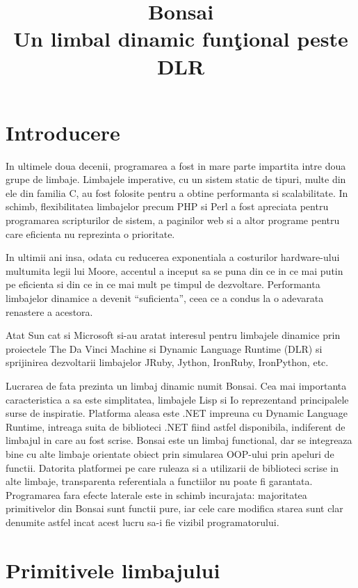 \documentclass[12pt,a4paper]{report}
\title{Bonsai\\Un limbal dinamic fun\c tional peste DLR}
\begin{document}
\maketitle
\tableofcontents

\chapter{Introducere}

In ultimele doua decenii, programarea a fost in mare parte impartita intre doua grupe de limbaje. Limbajele imperative, cu un sistem static de tipuri, multe din ele din familia C, au fost folosite pentru a obtine performanta si scalabilitate. In schimb, flexibilitatea limbajelor precum PHP si Perl a fost apreciata pentru programarea scripturilor de sistem, a paginilor web si a altor programe pentru care eficienta nu reprezinta o prioritate.

In ultimii ani insa, odata cu reducerea exponentiala a costurilor hardware-ului multumita legii lui Moore, accentul a inceput sa se puna din ce in ce mai putin pe eficienta si din ce in ce mai mult pe timpul de dezvoltare. Performanta limbajelor dinamice a devenit ``suficienta'', ceea ce a condus la o adevarata renastere a acestora.

Atat Sun cat si Microsoft si-au aratat interesul pentru limbajele dinamice prin proiectele The Da Vinci Machine\cite{daVinciMachine} si Dynamic Language Runtime (DLR)\cite{dlr} si sprijinirea dezvoltarii limbajelor JRuby\cite{jruby}, Jython\cite{jython}, IronRuby\cite{ironruby}, IronPython\cite{ironpython}, etc.

Lucrarea de fata prezinta un limbaj dinamic numit Bonsai. Cea mai importanta caracteristica a sa este simplitatea, limbajele Lisp si Io \cite{io} reprezentand principalele surse de inspiratie. Platforma aleasa este .NET impreuna cu Dynamic Language Runtime, intreaga suita de biblioteci .NET fiind astfel disponibila, indiferent de limbajul in care au fost scrise. Bonsai este un limbaj functional, dar se integreaza bine cu alte limbaje orientate obiect prin simularea OOP-ului prin apeluri de functii. Datorita platformei pe care ruleaza si a utilizarii de biblioteci scrise in alte limbaje, transparenta referentiala a functiilor nu poate fi garantata. Programarea fara efecte laterale este in schimb incurajata: majoritatea primitivelor din Bonsai sunt functii pure, iar cele care modifica starea sunt clar
denumite astfel incat acest lucru sa-i fie vizibil programatorului.

\chapter{Primitivele limbajului}
\end{document}
